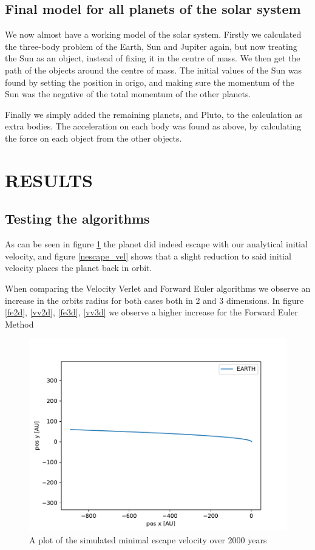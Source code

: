 \documentclass[a4paper]{article}
\begin{document}
	
	\subsection{Final model for all planets of the solar system}
	We now almost have a working model of the solar system. Firstly we calculated the three-body problem of the Earth, Sun and Jupiter again, but now treating the Sun as an object, instead of fixing it in the centre of mass. We then get the path of the objects around the centre of mass. The initial values of the Sun was found by setting the position in origo, and making sure the momentum of the Sun was the negative of the total momentum of the other planets. 
	
	Finally we simply added the remaining planets, and Pluto, to the calculation as extra bodies. The acceleration on each body was found as above, by calculating the force on each object from the other objects. 
	
	
	\section{RESULTS}
	\subsection{Testing the algorithms}
	As can be seen in figure \ref{escape_vel} the planet did indeed escape with our analytical initial velocity, and figure \ref{nescape_vel} shows that a slight reduction to said initial velocity places the planet back in orbit.
	
	When comparing the Velocity Verlet and Forward Euler algorithms we observe an increase in the orbits radius for both cases both in 2 and 3 dimensions. In figure \ref{fe2d}, \ref{vv2d}, \ref{fe3d}, \ref{vv3d} we observe a higher increase for the Forward Euler Method
	
	\begin{figure}[h!]
		\centering 
		\includegraphics[scale=0.7]{escapeVelocity2000.pdf}
		\caption{A plot of the simulated minimal escape velocity over 2000 years}
		\label{escape_vel}
	\end{figure}
	
\end{document}
